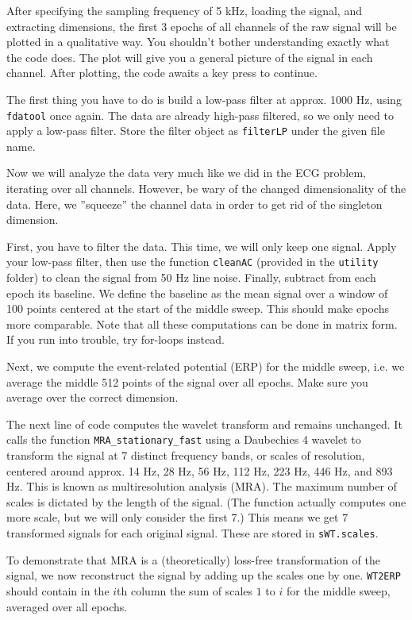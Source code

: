 \documentclass[10pt,a4paper,notitlepage]{report}
\begin{document}
After specifying the sampling frequency of 5 kHz, loading the signal, and extracting dimensions, the first 3 epochs of all channels of the raw signal will be plotted in a qualitative way. You shouldn't bother understanding exactly what the code does. The plot will give you a general picture of the signal in each channel. After plotting, the code awaits a key press to continue.

The first thing you have to do is build a low-pass filter at approx. 1000 Hz, using \texttt{fdatool} once again. The data are already high-pass filtered, so we only need to apply a low-pass filter. Store the filter object as \texttt{filterLP} under the given file name.

Now we will analyze the data very much like we did in the ECG problem, iterating over all channels. However, be wary of the changed dimensionality of the data. Here, we ''squeeze'' the channel data in order to get rid of the singleton dimension.

First, you have to filter the data. This time, we will only keep one signal. Apply your low-pass filter, then use the function \texttt{cleanAC} (provided in the \texttt{utility} folder) to clean the signal from 50 Hz line noise. Finally, subtract from each epoch its baseline. We define the baseline as the mean signal over a window of 100 points centered at the start of the middle sweep. This should make epochs more comparable. Note that all these computations can be done in matrix form. If you run into trouble, try for-loops instead.

Next, we compute the event-related potential (ERP) for the middle sweep, i.e. we average the middle 512 points of the signal over all epochs. Make sure you average over the correct dimension.

The next line of code computes the wavelet transform and remains unchanged. It calls the function \texttt{MRA\_stationary\_fast} using a Daubechies 4 wavelet to transform the signal at 7 distinct frequency bands, or scales of resolution, centered around approx. 14 Hz, 28 Hz, 56 Hz, 112 Hz, 223 Hz, 446 Hz, and 893 Hz. This is known as multiresolution analysis (MRA). The maximum number of scales is dictated by the length of the signal. (The function actually computes one more scale, but we will only consider the first 7.) This means we get 7 transformed signals for each original signal. These are stored in \texttt{sWT.scales}.

To demonstrate that MRA is a (theoretically) loss-free transformation of the signal, we now reconstruct the signal by adding up the scales one by one. \texttt{WT2ERP} should contain in the $i$th column the sum of scales $1$ to $i$ for the middle sweep, averaged over all epochs.
\end{document}
